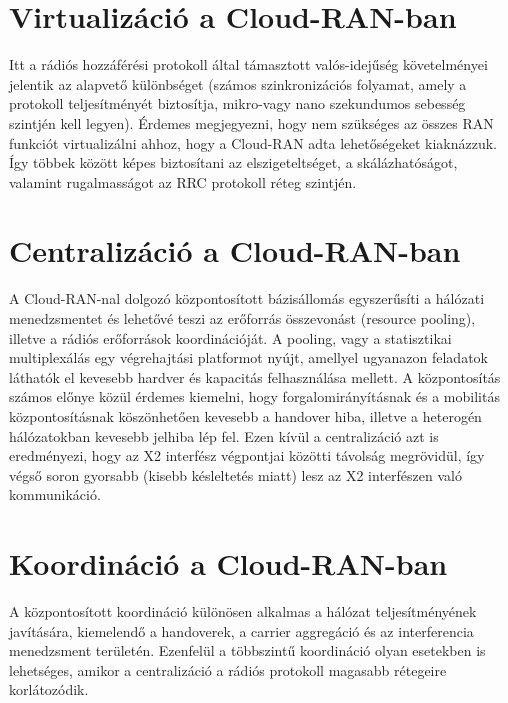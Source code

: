 \section{Virtualizáció a Cloud-RAN-ban}
\hspace{2mm}
\indent Itt a rádiós hozzáférési protokoll által támasztott valós-idejűség követelményei jelentik az alapvető különbséget (számos szinkronizációs folyamat, amely a protokoll teljesítményét biztosítja, mikro-vagy nano szekundumos sebesség szintjén kell legyen). 
Érdemes megjegyezni, hogy nem szükséges az összes RAN funkciót virtualizálni ahhoz, hogy a Cloud-RAN adta lehetőségeket kiaknázzuk. Így többek között képes biztosítani az elszigeteltséget, a skálázhatóságot, valamint rugalmasságot az RRC protokoll réteg szintjén.
\section{Centralizáció a Cloud-RAN-ban}
\hspace{2mm}
\indent A Cloud-RAN-nal dolgozó központosított bázisállomás egyszerűsíti a hálózati menedzsmentet és lehetővé teszi az erőforrás összevonást (resource pooling), illetve a rádiós erőforrások koordinációját. A pooling, vagy a statisztikai multiplexálás egy végrehajtási platformot nyújt, amellyel ugyanazon feladatok láthatók el kevesebb hardver és kapacitás felhasználása mellett. A központosítás számos előnye közül érdemes kiemelni, hogy forgalomirányításnak és a mobilitás központosításnak köszönhetően kevesebb a handover hiba, illetve a heterogén hálózatokban kevesebb jelhiba lép fel. Ezen kívül a centralizáció azt is eredményezi, hogy az X2 interfész végpontjai közötti távolság megrövidül, így végső soron gyorsabb (kisebb késleltetés miatt) lesz az X2 interfészen való kommunikáció.\cite{BenefitsFujitsu}
\section{Koordináció a Cloud-RAN-ban}
\hspace{2mm}
\indent A központosított koordináció különösen alkalmas a hálózat teljesítményének javítására, kiemelendő a handoverek, a carrier aggregáció és az interferencia menedzsment területén. Ezenfelül a többszintű koordináció olyan esetekben is lehetséges, amikor a centralizáció a rádiós protokoll magasabb rétegeire korlátozódik.\cite{BenefitsEricsson}\cite{NokiaSingle}
